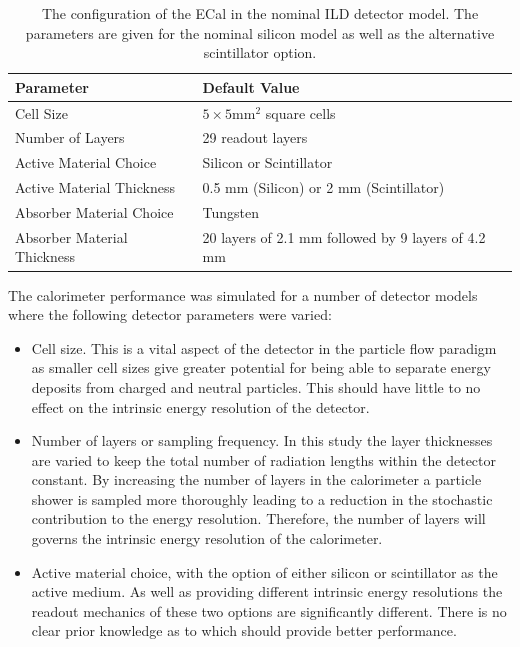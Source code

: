 \begin{table}[h!]
\centering
\begin{tabular}{ l l}
\hline
Parameter & Default Value \\
\hline
Cell Size & $5 \times 5 \text{mm}^{2}$ square cells \\
Number of Layers & 29 readout layers \\
Active Material Choice & Silicon or Scintillator  \\
Active Material Thickness & 0.5 mm (Silicon) or 2 mm (Scintillator)  \\
Absorber Material Choice & Tungsten \\
Absorber Material Thickness & 20 layers of 2.1 mm followed by 9 layers of 4.2 mm \\
\hline
\end{tabular}
\caption[The configuration of the ECal in the nominal ILD detector model.  The parameters are given for the nominal silicon model as well as the alternative scintillator option.]{The configuration of the ECal in the nominal ILD detector model.  The parameters are given for the nominal silicon model as well as the alternative scintillator option.}
\label{table:defaultildecal}
\end{table}

The calorimeter performance was simulated for a number of detector models where the following detector parameters were varied:
\begin{itemize}
\item Cell size.  This is a vital aspect of the detector in the particle flow paradigm as smaller cell sizes give greater potential for being able to separate energy deposits from charged and neutral particles.  This should have little to no effect on the intrinsic energy resolution of the detector.  
\item Number of layers or sampling frequency.  In this study the layer thicknesses are varied to keep the total number of radiation lengths within the detector constant.  By increasing the number of layers in the calorimeter a particle shower is sampled more thoroughly leading to a reduction in the stochastic contribution to the energy resolution.  Therefore, the number of layers will governs the intrinsic energy resolution of the calorimeter.
\item Active material choice, with the option of either silicon or scintillator as the active medium.  As well as providing different intrinsic energy resolutions the readout mechanics of these two options are significantly different.  There is no clear prior knowledge as to which should provide better performance. 
\end{itemize}

